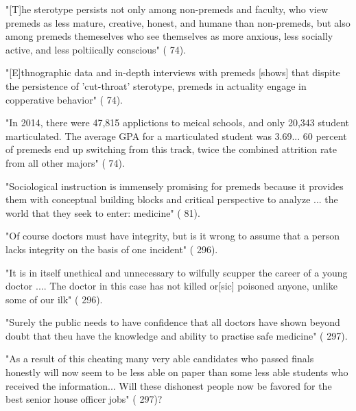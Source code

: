 "[T]he sterotype persists not only among non-premeds and faculty, who view premeds as less mature, creative, honest, and humane than non-premeds, but also among premeds themeselves who see themselves as more anxious, less socially active, and less poltiically conscious" (\cite{Olsen-2016} 74).

"[E]thnographic data and in-depth interviews with premeds [shows] that dispite the persistence of 'cut-throat' sterotype, premeds in actuality engage in copperative behavior" (\cite{Olsen-2016} 74).

"In 2014, there were 47,815 applictions to meical schools, and only 20,343 student marticulated. The average GPA for a marticulated student was 3.69... 60 percent of premeds end up switching from this track, twice the combined attrition rate from all other majors" (\cite{Olsen-2016} 74).

"Sociological instruction is immensely promising for premeds because it provides them with conceptual building blocks and critical perspective to analyze ... the world that they seek to enter: medicine" (\cite{Olsen-2016} 81).


"Of course doctors must have integrity, but is it wrong to assume that a person lacks integrity on the basis of one incident" (\cite{Spencer-2001} 296).

"It is in itself unethical and unnecessary to wilfully scupper the career of a young doctor .... The doctor in this case has not killed or[sic] poisoned anyone, unlike some of our ilk" (\cite{Spencer-2001} 296).

"Surely the public needs to have confidence that all doctors have shown beyond doubt that theu have the knowledge and ability to practise safe medicine" (\cite{Spencer-2001} 297).

"As a result of this cheating many very able candidates who passed finals honestly will now seem to be less able on paper than some less able students who received the information... Will these dishonest people now be favored for the best senior house officer jobs" (\cite{Spencer-2001} 297)?
